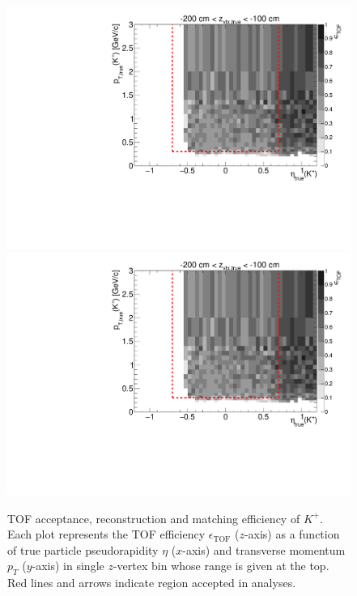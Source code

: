 \begin{figure}[hb]
\caption[TOF acceptance, reconstruction and matching efficiency of $K^{+}$.]{TOF acceptance, reconstruction and matching efficiency of $K^{+}$. Each plot represents the TOF efficiency $\epsilon_{\text{TOF}}$ ($z$-axis) as a function of true particle pseudorapidity $\eta$ ($x$-axis) and transverse momentum $p_{T}$ ($y$-axis) in single $z$-vertex bin whose range is given at the top. Red lines and arrows indicate region accepted in analyses.}\label{fig:eff_kaon_plus}
\centering
\parbox{0.495\textwidth}{
  \centering
  \includegraphics[width=\linewidth,page=3]{graphics/eff/Eff2D_TOF_kaon_Plus.pdf}\\
  \includegraphics[width=\linewidth,page=5]{graphics/eff/Eff2D_TOF_kaon_Plus.pdf}\\
}
\end{figure}
